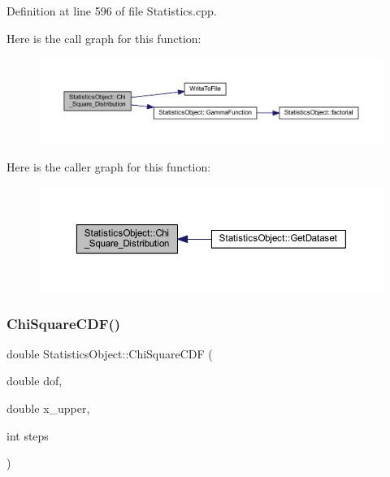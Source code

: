 Definition at line 596 of file Statistics.\+cpp.

Here is the call graph for this function\+:\nopagebreak
\begin{figure}[H]
\begin{center}
\leavevmode
\includegraphics[width=350pt]{class_statistics_object_a2bdaa3f298838c3f83bf17189c832623_cgraph}
\end{center}
\end{figure}
Here is the caller graph for this function\+:\nopagebreak
\begin{figure}[H]
\begin{center}
\leavevmode
\includegraphics[width=350pt]{class_statistics_object_a2bdaa3f298838c3f83bf17189c832623_icgraph}
\end{center}
\end{figure}
\mbox{\label{class_statistics_object_a7ad5fc88ce637ed421f4fccf92a8b5e0}} 
\subsubsection{\texorpdfstring{Chi\+Square\+C\+D\+F()}{ChiSquareCDF()}}
{\footnotesize\ttfamily double Statistics\+Object\+::\+Chi\+Square\+C\+DF (\begin{DoxyParamCaption}\item[{double}]{dof,  }\item[{double}]{x\+\_\+upper,  }\item[{int}]{steps }\end{DoxyParamCaption})}




